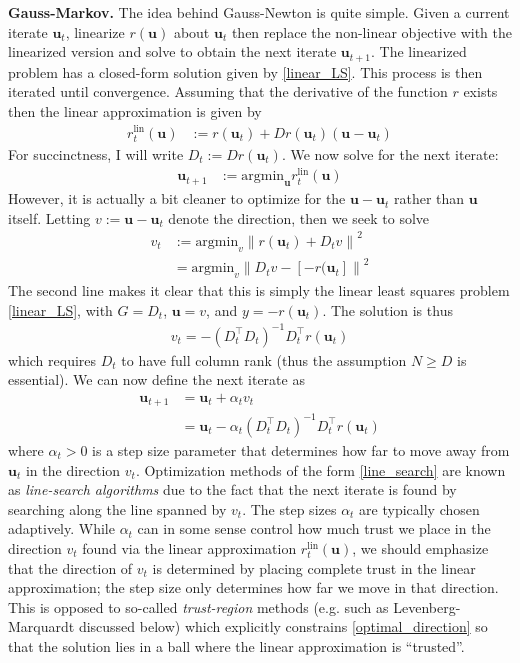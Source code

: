 \documentclass[12pt]{article}
\newcommand{\bpar}{\mathbf{u}} %
\newcommand*{\norm}[1]{\left\lVert#1\right\rVert}
\begin{document}
\bigskip
\noindent
\textbf{Gauss-Markov.}
The idea behind Gauss-Newton is quite simple. Given a current iterate $\bpar_t$, linearize $r(\bpar)$ about $\bpar_t$ then replace the non-linear objective with the linearized version and solve to obtain the 
next iterate $\bpar_{t+1}$. The linearized problem has a closed-form solution given by \ref{linear_LS}. This process is then iterated until convergence. Assuming that the derivative of the function $r$ 
exists then the linear approximation is given by 
\begin{align}
r_t^{\text{lin}}(\bpar) &:= r(\bpar_t) + Dr(\bpar_t)\left(\bpar - \bpar_t \right) 
\end{align}
For succinctness, I will write $D_t := Dr(\bpar_t)$. We now solve for the next iterate:
\begin{align*}
\bpar_{t + 1} &:= \text{argmin}_\bpar r_t^{\text{lin}}(\bpar)
\end{align*}
However, it is actually a bit cleaner to optimize for the  $\bpar - \bpar_t$ rather than $\bpar$ itself. Letting $v := \bpar - \bpar_t$ denote the direction, then we seek to solve
\begin{align}
v_t &:= \text{argmin}_v \norm{r(\bpar_t) + D_t v}^2 \label{optimal_direction} \\
	      &= \text{argmin}_v \norm{D_t v - [-r(\bpar_t]}^2
\end{align}
The second line makes it clear that this is simply the linear least squares problem \ref{linear_LS}, with $G = D_t$, $\bpar = v$, and $y = -r(\bpar_t)$. The solution is thus 
\begin{align*}
v_t = -\left(D_t^\top D_t \right)^{-1} D_t^\top r(\bpar_t)
\end{align*}
which requires $D_t$ to have full column rank (thus the assumption $N \geq D$ is essential). We can now define the next iterate as 
\begin{align}
\bpar_{t + 1} &= \bpar_t + \alpha_t v_t \label{line_search} \\
		    &= \bpar_t - \alpha_t \left(D_t^\top D_t \right)^{-1} D_t^\top r(\bpar_t) \label{GN_update}
\end{align}
where $\alpha_t > 0$ is a step size parameter that determines how far to move away from $\bpar_t$ in the direction $v_t$. Optimization methods of the form \ref{line_search} are known as 
\textit{line-search algorithms} due to the fact that the next iterate is found by searching along the line spanned by $v_t$. The step sizes $\alpha_t$ are typically chosen adaptively. While 
$\alpha_t$ can in some sense control how much trust we place in the direction $v_t$ found via the linear approximation $r_t^{\text{lin}}(\bpar)$, we should emphasize that the direction of $v_t$ is 
determined by placing complete trust in the linear approximation; the step size only determines how far we move in that direction. This is opposed to so-called \textit{trust-region} methods
(e.g. such as Levenberg-Marquardt discussed below) which explicitly constrains \ref{optimal_direction} so that the solution lies in a ball where the linear approximation is ``trusted''. 
\end{document}
